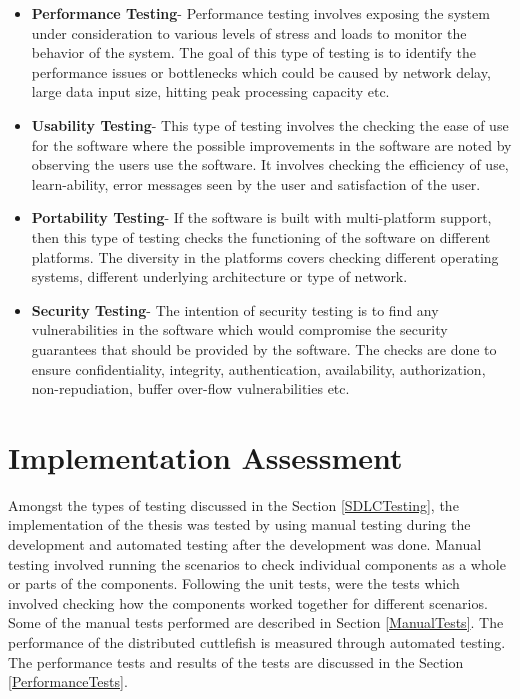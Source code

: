 \begin{itemize}
\item{\textbf{Performance Testing}}- Performance testing involves exposing the system under consideration to various levels of stress and loads to monitor the behavior of the system. The goal of this type of testing is to identify the performance issues or bottlenecks which could be caused by network delay, large data input size, hitting peak processing capacity etc.  
\item{\textbf{Usability Testing}}- This type of testing involves the checking the ease of use for the software where the possible improvements in the software are noted by observing the users use the software. It involves checking the efficiency of use, learn-ability, error messages seen by the user and satisfaction of the user.
\item{\textbf{Portability Testing}}- If the software is built with multi-platform support, then this type of testing checks the functioning of the software on different platforms. The diversity in the platforms covers checking different operating systems, different underlying architecture or type of network.    
\item{\textbf{Security Testing}}- The intention of security testing is to find any vulnerabilities in the software which would compromise the security guarantees that should be provided by the software. The checks are done to ensure confidentiality, integrity, authentication, availability, authorization, non-repudiation, buffer over-flow vulnerabilities etc. 
\end{itemize} 

\section{Implementation Assessment}

Amongst the types of testing discussed in the Section \ref{SDLCTesting}, the implementation of the thesis was tested by using manual testing during the development and automated testing after the development was done. Manual testing involved running the scenarios to check individual components as a whole or parts of the components. Following the unit tests, were the tests which involved checking how the components worked together for different scenarios. Some of the manual tests performed are described in Section \ref{ManualTests}. The performance of the distributed cuttlefish is measured through automated testing. The performance tests and results of the tests are discussed in the Section \ref{PerformanceTests}.

